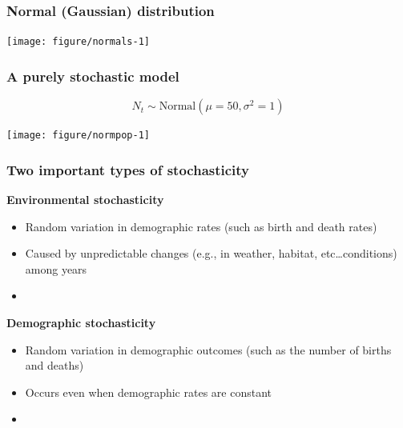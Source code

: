 \documentclass[color=usenames,dvipsnames]{beamer}\usepackage[]{graphicx}\usepackage[]{xcolor}
\newenvironment{knitrout}{}{} %
\begin{document}
\begin{frame}[fragile]
  \frametitle{Normal (Gaussian) distribution}
  \vspace{-0.7cm}
  \begin{center}
\begin{knitrout}
\color{fgcolor}
\texttt{[image: figure/normals-1]} 
\end{knitrout}
  \end{center}
\end{frame}





\begin{frame}[fragile]
  \frametitle{A purely stochastic model}
  \vspace{-3mm}
  \[
    N_t \sim \mbox{Normal}(\mu=50, \sigma^2=1)
  \]
  \vspace{-8mm}

\begin{center}
  \texttt{[image: figure/normpop-1]}
\end{center}
\end{frame}



\begin{frame}
  \frametitle{Two important types of stochasticity}
  {\bf Environmental stochasticity}
  \begin{itemize}
    \item Random variation in demographic rates (such as birth
      and death rates)
    \item Caused by unpredictable changes (e.g., in weather, habitat,
      etc\dots conditions) among years
    \item[]
  \end{itemize}
  \pause
  {\bf Demographic stochasticity}
  \begin{itemize}
    \item Random variation in demographic outcomes (such as the number
      of births and deaths)
    \item Occurs even when demographic rates are constant 
    \item[]
  \end{itemize}
\end{frame}
\end{document}
